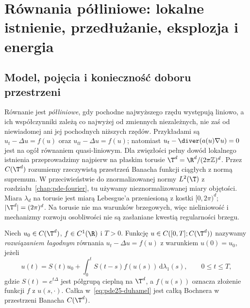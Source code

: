 \chapter[Równania półliniowe i eksplozja]{Równania półliniowe: lokalne istnienie, przedłużanie, eksplozja i energia}
\label{chap:pde25}

\section{Model, pojęcia i konieczność doboru przestrzeni}
Równanie jest \emph{półliniowe}, gdy pochodne najwyższego
rzędu występują liniowo, a ich współczynniki zależą
co najwyżej od zmiennych niezależnych, nie zaś od
niewiadomej ani jej pochodnych niższych rzędów.
Przykładami są $u_t-\Delta u=f(u)$ oraz
$u_{tt}-\Delta u=f(u)$; natomiast $u_t-\diver(a(u)\nabla u)=0$
jest na ogół równaniem quasi-liniowym.
Dla zwięzłości pełny dowód lokalnego istnienia przeprowadzimy
najpierw na płaskim torusie $\T^d=\R^d/(2\pi\mathbb Z)^d$.
Przez $C(\T^d)$ rozumiemy rzeczywistą przestrzeń Banacha funkcji
ciągłych z normą supremum. W przeciwieństwie do znormalizowanej
normy $L^2(\T)$ z rozdziału~\ref{chap:pde-fourier},
tu używamy nieznormalizowanej miary objętości. Miara $\lambda_d$ na torusie jest
miarą Lebesgue'a przeniesioną z kostki $[0,2\pi)^d$;
$|\T^d|=(2\pi)^d$. Na torusie nie ma warunków brzegowych,
więc nieliniowość i mechanizmy rozwoju osobliwości nie są zasłaniane
kwestią regularności brzegu.

\begin{definicja}
\label{def:pde25-mild}
Niech $u_0\in C(\T^d)$, $f\in C^1(\R)$ i $T>0$.
Funkcję $u\in C([0,T];C(\T^d))$ nazywamy
\emph{rozwiązaniem łagodnym} równania $u_t-\Delta u=f(u)$
z warunkiem $u(0)=u_0$, jeżeli
\begin{equation}\label{eq:pde25-duhamel}
 u(t)=S(t)u_0+\int_0^tS(t-s)f(u(s))\,\mathrm d\lambda_1(s),
 \qquad 0\le t\le T,
\end{equation}
gdzie $S(t)=e^{t\Delta}$ jest półgrupą cieplną na $\T^d$,
a $f(u(s))$ oznacza złożenie funkcji $f$ z $u(s,\cdot)$.
Całka w~\eqref{eq:pde25-duhamel} jest całką Bochnera
w przestrzeni Banacha $C(\T^d)$.
\end{definicja}

